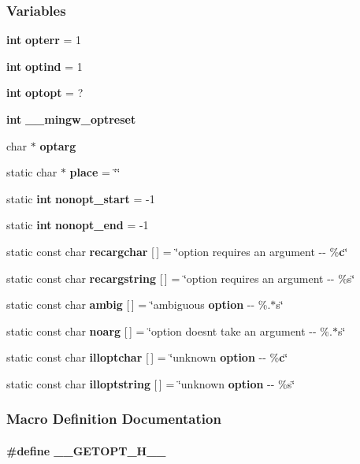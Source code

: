 \subsubsection*{Variables}
\begin{DoxyCompactItemize}
\item 
{\bf int} {\bf opterr} = 1
\item 
{\bf int} {\bf optind} = 1
\item 
{\bf int} {\bf optopt} = \textquotesingle{}?\textquotesingle{}
\item 
{\bf int} {\bf \+\_\+\+\_\+mingw\+\_\+optreset}
\item 
char $\ast$ {\bf optarg}
\item 
static char $\ast$ {\bf place} = \char`\"{}\char`\"{}
\item 
static {\bf int} {\bf nonopt\+\_\+start} = -\/1
\item 
static {\bf int} {\bf nonopt\+\_\+end} = -\/1
\item 
static const char {\bf recargchar} [$\,$] = \char`\"{}option requires an argument -\/-\/ \%{\bf c}\char`\"{}
\item 
static const char {\bf recargstring} [$\,$] = \char`\"{}option requires an argument -\/-\/ \%s\char`\"{}
\item 
static const char {\bf ambig} [$\,$] = \char`\"{}ambiguous {\bf option} -\/-\/ \%.$\ast$s\char`\"{}
\item 
static const char {\bf noarg} [$\,$] = \char`\"{}option doesn\textquotesingle{}t take an argument -\/-\/ \%.$\ast$s\char`\"{}
\item 
static const char {\bf illoptchar} [$\,$] = \char`\"{}unknown {\bf option} -\/-\/ \%{\bf c}\char`\"{}
\item 
static const char {\bf illoptstring} [$\,$] = \char`\"{}unknown {\bf option} -\/-\/ \%s\char`\"{}
\end{DoxyCompactItemize}


\subsubsection{Macro Definition Documentation}
\paragraph[{\+\_\+\+\_\+\+G\+E\+T\+O\+P\+T\+\_\+\+H\+\_\+\+\_\+}]{\setlength{\rightskip}{0pt plus 5cm}\#define \+\_\+\+\_\+\+G\+E\+T\+O\+P\+T\+\_\+\+H\+\_\+\+\_\+}\label{soapysdr_2apps_2msvc_2getopt_8h_ab74b871ab5bc8fdcf0977a911c46f0b4}


